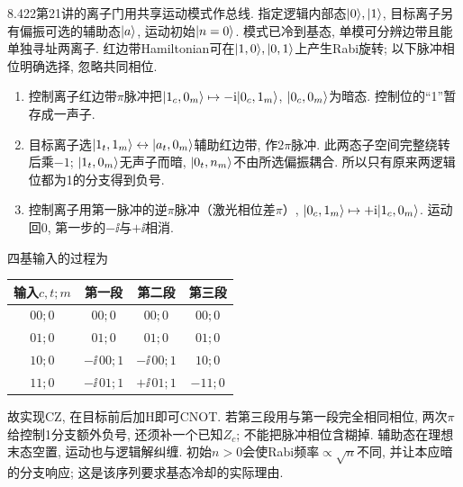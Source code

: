 8.422第21讲的离子门用共享运动模式作总线. 指定逻辑内部态$\lvert 0\rangle,\lvert 1\rangle$, 目标离子另有偏振可选的辅助态$\lvert a\rangle$, 运动初始$\lvert n=0\rangle$. 模式已冷到基态, 单模可分辨边带且能单独寻址两离子. 红边带Hamiltonian可在$\lvert 1,0\rangle,\lvert 0,1\rangle$上产生Rabi旋转; 以下脉冲相位明确选择, 忽略共同相位.
\begin{enumerate}
\item 控制离子红边带$\pi$脉冲把$\lvert 1_c,0_m\rangle\mapsto-\mathrm i\lvert 0_c,1_m\rangle$, $\lvert 0_c,0_m\rangle$为暗态. 控制位的“1”暂存成一声子.
\item 目标离子选$\lvert 1_t,1_m\rangle\leftrightarrow\lvert a_t,0_m\rangle$辅助红边带, 作$2\pi$脉冲. 此两态子空间完整绕转后乘$-1$; $\lvert 1_t,0_m\rangle$无声子而暗, $\lvert 0_t,n_m\rangle$不由所选偏振耦合. 所以只有原来两逻辑位都为1的分支得到负号.
\item 控制离子用第一脉冲的逆$\pi$脉冲（激光相位差$\pi$）, $\lvert 0_c,1_m\rangle\mapsto+\mathrm i\lvert 1_c,0_m\rangle$. 运动回0, 第一步的$-\ii$与$+\ii$相消.
\end{enumerate}
四基输入的过程为
\begin{center}\begin{tabular}{c|c|c|c}
输入$c,t;m$&第一段&第二段&第三段\\\hline
$00;0$&$00;0$&$00;0$&$00;0$\\
$01;0$&$01;0$&$01;0$&$01;0$\\
$10;0$&$-\ii\,00;1$&$-\ii\,00;1$&$10;0$\\
$11;0$&$-\ii\,01;1$&$+\ii\,01;1$&$-11;0$
\end{tabular}\end{center}
故实现CZ, 在目标前后加H即可CNOT. 若第三段用与第一段完全相同相位, 两次$\pi$给控制1分支额外负号, 还须补一个已知$Z_c$; 不能把脉冲相位含糊掉. 辅助态在理想末态空置, 运动也与逻辑解纠缠. 初始$n>0$会使Rabi频率$\propto\sqrt n$不同, 并让本应暗的分支响应; 这是该序列要求基态冷却的实际理由.
